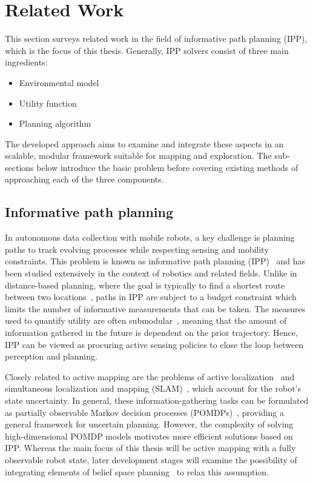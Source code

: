 \section{Related Work}
\label{S:related_work}

This section surveys related work in the field of informative path planning (IPP), which is the focus of 
this thesis. Generally, IPP solvers consist of three main ingredients: 

\begin{itemize}
 \item Environmental model
 \item Utility function
 \item Planning algorithm
\end{itemize}

The developed approach aims to examine and integrate these aspects in an scalable, modular framework 
suitable for mapping and exploration. The sub-sections below introduce the basic problem before covering 
existing methods of approaching each of the three components.

\subsection{Informative path planning}

In autonomous data collection with mobile robots, a key challenge is planning paths to track evolving 
processes while respecting sensing and mobility constraints. This problem is known as informative 
path planning (IPP)~\cite{Singh2009} and has been studied extensively in the context of robotics and 
related fields. Unlike in distance-based planning, where the goal is typically to find a shortest 
route between two locations~\cite{Dijkstra1959}, paths in IPP are subject to a budget constraint 
which limits the number of informative measurements that can be taken. The measures used to quantify 
utility are often submodular~\cite{Krause2011}, meaning that the amount of information gathered in the 
future is dependent on the prior trajectory. Hence, IPP can be viewed as procuring active 
sensing policies to close the loop between perception and planning.

Closely related to active mapping are the problems of active localization~\cite{Thrun1999} and simultaneous 
localization and mapping (SLAM)~\cite{Mu2015, Indelman2014, Bry2011}, which account for the robot's 
state uncertainty. In general, these information-gathering tasks can be formulated as partially observable 
Markov decision processes (POMDPs)~\cite{Kaelbling1998}, providing a general framework for uncertain 
planning. However, the complexity of solving high-dimensional POMDP models motivates more 
efficient solutions based on IPP. Whereas the main focus of this thesis will be active mapping with a 
fully observable robot state, later development stages will examine the possibility of integrating 
elements of belief space planning~\cite{Indelman2014, Indelman2015a} to relax this assumption.

